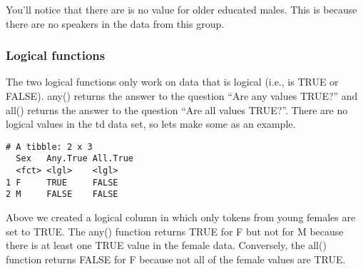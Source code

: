 \documentclass[
  12pt,
  letterpaper]{article}
\newenvironment{Shaded}{\begin{snugshade}}{\end{snugshade}}
\newcommand{\AttributeTok}[1]{\textcolor[rgb]{0.40,0.45,0.13}{#1}}
\newcommand{\CommentTok}[1]{\textcolor[rgb]{0.37,0.37,0.37}{#1}}
\newcommand{\ConstantTok}[1]{\textcolor[rgb]{0.56,0.35,0.01}{#1}}
\newcommand{\FunctionTok}[1]{\textcolor[rgb]{0.28,0.35,0.67}{#1}}
\newcommand{\NormalTok}[1]{\textcolor[rgb]{0.00,0.23,0.31}{#1}}
\newcommand{\OtherTok}[1]{\textcolor[rgb]{0.00,0.23,0.31}{#1}}
\newcommand{\SpecialCharTok}[1]{\textcolor[rgb]{0.37,0.37,0.37}{#1}}
\newcommand{\StringTok}[1]{\textcolor[rgb]{0.13,0.47,0.30}{#1}}
\renewcommand\texttt[1]{{\ttfamily\color{BrickRed}#1}}
\begin{document}
You'll notice that there are is no value for older educated males. This
is because there are no speakers in the data from this group.

\hypertarget{logical-functions}{%
\subsubsection{Logical functions}\label{logical-functions}}

The two logical functions only work on data that is logical (i.e., is
\texttt{TRUE} or \texttt{FALSE}). \texttt{any()} returns the answer to
the question ``Are any values \texttt{TRUE}?'' and \texttt{all()}
returns the answer to the question ``Are all values \texttt{TRUE}?''.
There are no logical values in the \texttt{td} data set, so lets make
some as an example.

\begin{Shaded}
\end{Shaded}

\begin{verbatim}
# A tibble: 2 x 3
  Sex   Any.True All.True
  <fct> <lgl>    <lgl>   
1 F     TRUE     FALSE   
2 M     FALSE    FALSE   
\end{verbatim}

Above we created a logical column in which only tokens from young
females are set to \texttt{TRUE}. The \texttt{any()} function returns
\texttt{TRUE} for \texttt{F} but not for \texttt{M} because there is at
least one \texttt{TRUE} value in the female data. Conversely, the
\texttt{all()} function returns \texttt{FALSE} for \texttt{F} because
not all of the female values are \texttt{TRUE}.
\end{document}
